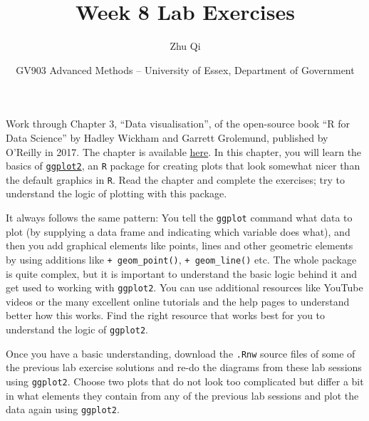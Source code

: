 \documentclass[a4paper,12pt]{article}\usepackage[]{graphicx}\usepackage[]{color}
\title{Week 8 Lab Exercises}
\author{Zhu Qi}
\date{GV903 Advanced Methods -- University of Essex, Department of Government}
\begin{document}
\maketitle

Work through Chapter 3, ``Data visualisation'', of the open-source book ``R for Data Science'' by Hadley Wickham and Garrett Grolemund, published by O'Reilly in 2017. The chapter is available \href{https://r4ds.had.co.nz/data-visualisation.html}{here}. In this chapter, you will learn the basics of \href{https://ggplot2.tidyverse.org/}{\texttt{ggplot2}}, an \texttt{R} package for creating plots that look somewhat nicer than the default graphics in \texttt{R}. Read the chapter and complete the exercises; try to understand the logic of plotting with this package.

It always follows the same pattern: You tell the \texttt{ggplot} command what data to plot (by supplying a data frame and indicating which variable does what), and then you add graphical elements like points, lines and other geometric elements by using additions like \verb|+ geom_point()|, \verb|+ geom_line()| etc. The whole package is quite complex, but it is important to understand the basic logic behind it and get used to working with \texttt{ggplot2}. You can use additional resources like YouTube videos or the many excellent online tutorials and the help pages to understand better how this works. Find the right resource that works best for you to understand the logic of \verb+ggplot2+.

Once you have a basic understanding, download the \verb+.Rnw+ source files of some of the previous lab exercise solutions and re-do the diagrams from these lab sessions using \texttt{ggplot2}. Choose two plots that do not look too complicated but differ a bit in what elements they contain from any of the previous lab sessions and plot the data again using \texttt{ggplot2}.
\end{document}
